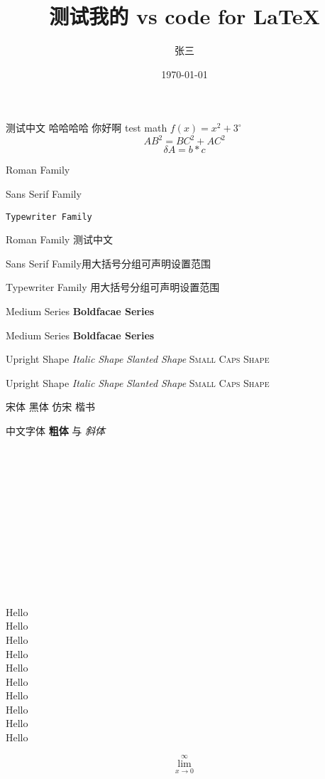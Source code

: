 \documentclass[12pt]{article}%
\title{\heiti 测试我的 vs code for \LaTeX}%
\author{\kaishu 张三}%
\date{\heiti \today}%
\newcommand\degree{^\circ}%
\begin{document}
\maketitle
测试中文
哈哈哈哈
你好啊
test math $f(x)=x^2+3\degree$ %
\begin{equation}
    AB^2=BC^2+AC^2
\end{equation}%
\begin{equation}
    \delta A=b*c
\end{equation}

\textrm{Roman Family}%

\textsf{Sans Serif Family}

\texttt{Typewriter Family}

{\rmfamily Roman Family 测试中文}

{\sffamily Sans Serif Family}用大括号分组可声明设置范围

{\ttfamily Typewriter Family 用大括号分组可声明设置范围}

\textmd{Medium Series} \textbf{Boldfacae Series}

{\mdseries Medium Series} {\bfseries Boldfacae Series}

\textup{Upright Shape} \textit{Italic Shape}
\textsl{Slanted Shape} \textsc{Small Caps Shape}

{\upshape Upright Shape} {\itshape Italic Shape}
{\slshape Slanted Shape} {\scshape Small Caps Shape}

{\songti 宋体}
\quad 
{\heiti 黑体} 
\quad 
{\fangsong 仿宋}
\quad 
{\kaishu 楷书} 

中文字体 \textbf{粗体} 与  \textit{斜体}
\\ \\ \\ \\ \\ \\ \\ \\ \\ \\ \\ \\ \\ 
{\tiny  Hello}\\
{\scriptsize Hello}\\
{\footnotesize Hello}\\
{\small Hello}\\
{\normalsize Hello}\\
{\large Hello}\\
{\Large Hello}\\
{\LARGE Hello}\\
{\huge Hello}\\
{\Huge Hello}

\[
  \lim_{x \to 0}^\infty
\]
\end{document}
